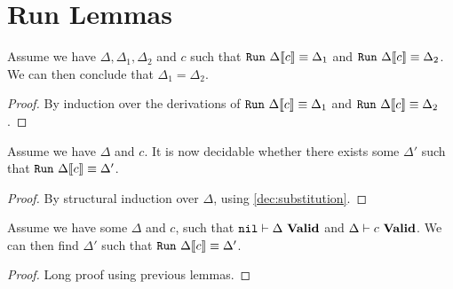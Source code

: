 \section{Run Lemmas}

\begin{lemma}
  Assume we have $\Delta, \Delta_1, \Delta_2$ and $c$ such that
  $\mathtt{Run}\ {\Delta} \llbracket {c} \rrbracket \equiv {\Delta_1}$ and $\mathtt{Run}\ {\Delta} \llbracket {c} \rrbracket \equiv {\Delta_2}$. We can then
  conclude that $\Delta_1 = \Delta_2$.
\end{lemma}

\begin{proof}
  By induction over the derivations of $\mathtt{Run}\ {\Delta} \llbracket {c} \rrbracket \equiv {\Delta_1}$ and
  $\mathtt{Run}\ {\Delta} \llbracket {c} \rrbracket \equiv {\Delta_2}$.
\end{proof}

\begin{lemma}
  Assume we have $\Delta$ and $c$. It is now decidable whether there exists some
  $\Delta'$ such that $\mathtt{Run}\ {\Delta} \llbracket {c} \rrbracket \equiv {\Delta'}$.
\end{lemma}

\begin{proof}
  By structural induction over $\Delta$, using \autoref{dec:substitution}.
\end{proof}

\begin{lemma}
  Assume we have some $\Delta$ and $c$, such that ${\mathtt{nil}} |- {\Delta}\ \mathbf{Valid}$
  and ${\Delta} |- {c}\ \mathbf{Valid}$. We can then find $\Delta'$ such that
  $\mathtt{Run}\ {\Delta} \llbracket {c} \rrbracket \equiv {\Delta'}$.
\end{lemma}

\begin{proof}
  Long proof using previous lemmas.
\end{proof}
